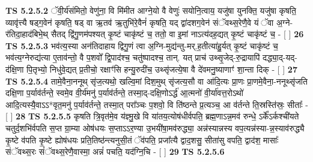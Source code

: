 \documentclass[17pt]{extarticle}
\begin{document}
                  \newline
                                \textbf{ TS 5.2.5.2} \newline
                  ॅवी॒र्य॑संमितो॒ वेणु॑ना॒ वि मि॑मीत आग्ने॒यो वै वेणुः॑ सयोनि॒त्वाय॒ यजु॑षा युनक्ति॒ यजु॑षा कृषति॒ व्यावृ॑त्त्यै षड्ग॒वेन॑ कृषति॒ षड् वा ऋ॒तव॑ ऋ॒तुभि॑रे॒वैनं॑ कृषति॒ यद् द्वा॑दशग॒वेन॑ संॅवथ्स॒रेणै॒वे यं ॅवा अ॒ग्ने-र॑तिदा॒हाद॑बिभे॒थ् सैतद् द्वि॑गु॒णम॑पश्यत् कृ॒ष्टं चाकृ॑ष्टं च॒ ततो॒ वा इ॒मां नाऽत्य॑दह॒द्यत् कृ॒ष्टं चाकृ॑ष्टं च॒ - [  ] \textbf{  26} \newline
                  \newline
                                \textbf{ TS 5.2.5.3} \newline
                  भव॑त्य॒स्या अन॑तिदाहाय द्विगु॒णं त्वा अ॒ग्नि-मुद्य॑न्तु-मर्.ह॒तीत्या॑हु॒र्यत् कृ॒ष्टं चाकृ॑ष्टं च॒ भव॑त्य॒ग्नेरुद्य॑त्या ए॒ताव॑न्तो॒ वै प॒शवो᳚ द्वि॒पाद॑श्च॒ चतु॑ष्पादश्च॒ तान्. यत् प्राच॑ उथ्सृ॒जेद्-रु॒द्रायापि॑ दद्ध्या॒द्-यद्-द॑क्षि॒णा पि॒तृभ्यो॒ निधु॑वे॒द्यत् प्र॒तीचो॒ रक्षाꣳ॑सि हन्यु॒रुदी॑च॒ उथ्सृ॑जत्ये॒षा वै दे॑वमनु॒ष्याणाꣳ॑ शा॒न्ता दिक् - [  ] \textbf{  27} \newline
                  \newline
                                \textbf{ TS 5.2.5.4} \newline
                  तामे॒वैना॒ननूथ् सृ॑ज॒त्यथो॒ खल्वि॒मां दिश॒मुथ् सृ॑जत्य॒सौ वा आ॑दि॒त्यः प्रा॒णः प्रा॒णमे॒वैना॒-ननूथ्सृ॑जति दक्षि॒णा प॒र्याव॑र्तन्ते॒ स्वमे॒व वी॒र्य॑मनु॑ प॒र्याव॑र्तन्ते॒ तस्मा॒द्-दक्षि॒णोऽर्द्ध॑ आ॒त्मनो॑ वी॒र्या॑वत्त॒रोऽथो॑ आदि॒त्यस्यै॒वाऽऽ*वृत॒मनु॑ प॒र्याव॑र्तन्ते॒ तस्मा॒त् परा᳚ञ्चः प॒शवो॒ वि ति॑ष्ठन्ते प्र॒त्यञ्च॒ आ व॑र्तन्ते ति॒स्रस्ति॑स्रः॒ सीताः᳚ - [  ] \textbf{  28} \newline
                  \newline
                                \textbf{ TS 5.2.5.5} \newline
                  कृषति त्रि॒वृत॑मे॒व य॑ज्ञ्मु॒खे वि या॑तय॒त्योष॑धीर्वपति॒ ब्रह्म॒णाऽन्न॒मव॑ रुन्धे॒ ऽर्के᳚ऽर्कश्ची॑यते चतुर्द॒शभि॑र्वपति स॒प्त ग्रा॒म्या ओष॑धयः स॒प्ताऽऽर॒ण्या उ॒भयी॑षा॒मव॑रुद्ध्या॒ अन्न॑स्यान्नस्य वप॒त्यन्न॑स्या-न्न॒स्याव॑रुद्ध्यै कृ॒ष्टे व॑पति कृ॒ष्टे ह्योष॑धयः प्रति॒तिष्ठ॑न्त्यनुसी॒तं ॅव॑पति॒ प्रजा᳚त्यै द्वाद॒शसु॒ सीता॑सु वपति॒ द्वाद॑श॒ मासाः᳚ संॅवथ्स॒रः सं॑ॅवथ्स॒रेणै॒वास्मा॒ अन्नं॑ पचति॒ यद॑ग्नि॒चि - [  ] \textbf{  29} \newline
                  \newline
                                \textbf{ TS 5.2.5.6} \newline
\end{document}
